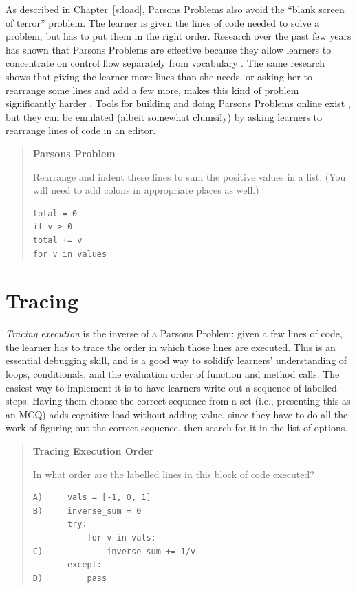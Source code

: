 As described in Chapter~\ref{s:load}, \protect\hyperlink{g:parsons-problem}{Parsons
Problems} also avoid the ``blank screen of terror''
problem. The learner is given the lines of code needed to solve a
problem, but has to put them in the right order. Research over the
past few years has shown that Parsons Problems are effective because
they allow learners to concentrate on control flow separately from
vocabulary
\cite{Pars2006,Eric2015,Morr2016,Eric2017}. The
same research shows that giving the learner more lines than she needs,
or asking her to rearrange some lines and add a few more, makes this
kind of problem significantly harder \cite{Harm2016}. Tools for
building and doing Parsons Problems online exist \cite{Ihan2011},
but they can be emulated (albeit somewhat clumsily) by asking learners
to rearrange lines of code in an editor.

\begin{quote}\setlength{\parindent}{0pt}
\textbf{Parsons Problem}

Rearrange and indent these lines to sum the positive values in a list.
(You will need to add colons in appropriate places as well.)

\begin{verbatim}
total = 0
if v > 0
total += v
for v in values
\end{verbatim}
\end{quote}

\section{Tracing}\label{s:exercises-tracing}

\emph{Tracing execution} is the inverse of a Parsons Problem: given a few
lines of code, the learner has to trace the order in which those lines
are executed. This is an essential debugging skill, and is a good way to
solidify learners' understanding of loops, conditionals, and the
evaluation order of function and method calls. The easiest way to
implement it is to have learners write out a sequence of labelled steps.
Having them choose the correct sequence from a set (i.e., presenting
this as an MCQ) adds cognitive load without adding value, since they
have to do all the work of figuring out the correct sequence, then
search for it in the list of options.

\begin{quote}\setlength{\parindent}{0pt}
\textbf{Tracing Execution Order}

In what order are the labelled lines in this block of code executed?

\begin{verbatim}
A)     vals = [-1, 0, 1]
B)     inverse_sum = 0
       try:
           for v in vals:
C)             inverse_sum += 1/v
       except:
D)         pass
\end{verbatim}
\end{quote}

